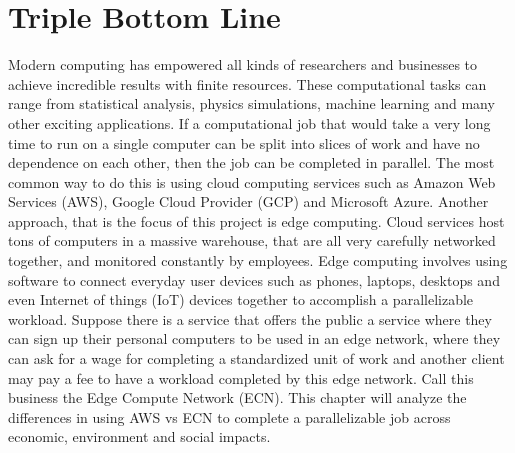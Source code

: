\documentclass[../mthe-493-final-project.tex]{subfiles}
\begin{document}
    \chapter{Triple Bottom Line}
    \label{ch:triple-bottom-line}

    Modern computing has empowered all kinds of researchers and businesses to achieve incredible results with finite resources. These computational tasks can range from statistical analysis, physics simulations, machine learning and many other exciting applications. If a computational job that would take a very long time to run on a single computer can be split into slices of work and have no dependence on each other, then the job can be completed in parallel. The most common way to do this is using cloud computing services such as Amazon Web Services (AWS), Google Cloud Provider (GCP) and Microsoft Azure. Another approach, that is the focus of this project is edge computing. Cloud services host tons of computers in a massive warehouse, that are all very carefully networked together, and monitored constantly by employees. Edge computing involves using software to connect everyday user devices such as phones, laptops, desktops and even Internet of things (IoT) devices together to accomplish a parallelizable workload. Suppose there is a service that offers the public a service where they can sign up their personal computers to be used in an edge network, where they can ask for a wage for completing a standardized unit of work and another client may pay a fee to have a workload completed by this edge network. Call this business the Edge Compute Network (ECN). This chapter will analyze the differences in using AWS vs ECN to complete a parallelizable job across economic, environment and social impacts. 
    
\end{document}
